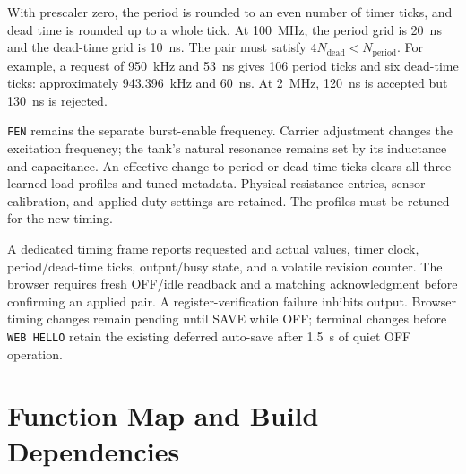 With prescaler zero, the period is rounded to an even number of timer ticks, and dead time is rounded up to a whole tick. At \SI{100}{\mega\hertz}, the period grid is \SI{20}{\nano\second} and the dead-time grid is \SI{10}{\nano\second}. The pair must satisfy \(4N_{\mathrm{dead}}<N_{\mathrm{period}}\). For example, a request of \SI{950}{\kilo\hertz} and \SI{53}{\nano\second} gives 106 period ticks and six dead-time ticks: approximately \SI{943.396}{\kilo\hertz} and \SI{60}{\nano\second}. At \SI{2}{\mega\hertz}, \SI{120}{\nano\second} is accepted but \SI{130}{\nano\second} is rejected.

\texttt{FEN} remains the separate burst-enable frequency. Carrier adjustment changes the excitation frequency; the tank's natural resonance remains set by its inductance and capacitance. An effective change to period or dead-time ticks clears all three learned load profiles and tuned metadata. Physical resistance entries, sensor calibration, and applied duty settings are retained. The profiles must be retuned for the new timing.

A dedicated timing frame reports requested and actual values, timer clock, period/dead-time ticks, output/busy state, and a volatile revision counter. The browser requires fresh OFF/idle readback and a matching acknowledgment before confirming an applied pair. A register-verification failure inhibits output. Browser timing changes remain pending until SAVE while OFF; terminal changes before \texttt{WEB HELLO} retain the existing deferred auto-save after \SI{1.5}{\second} of quiet OFF operation.

\section{Function Map and Build Dependencies}
\label{sec:app-fw-functions}

